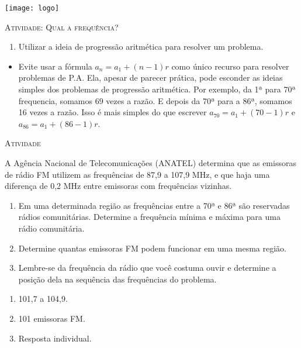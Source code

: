 \documentclass[10 pt,usenames,dvipsnames, oneside]{article}
\begin{document}
\begin{center}
  \begin{minipage}[l]{3cm}
\texttt{[image: logo]}    
\end{minipage}\hfill
\begin{minipage}[r]{.8\textwidth}
 {\Large \scshape Atividade: Qual a frequência?}  
\end{minipage}
\end{center}
\vspace{.2cm}

\ifdefined\prof
\begin{objetivos}
\item \phantom{a}
\end{objetivos}

\begin{goals}
\begin{enumerate}
\item Utilizar a ideia de progressão aritmética para resolver um problema.
\end{enumerate}

\tcblower
\begin{itemize}
\item Evite usar a fórmula $a_n=a_1+(n−1)r$ como único recurso para resolver problemas de P.A. Ela, apesar de parecer prática, pode esconder as ideias simples dos problemas de progressão aritmética. Por exemplo, da 1ª para 70ª frequencia, somamos $69$ vezes a razão. E depois da 70ª para a 86ª, somamos 16 vezes a razão. Isso é mais simples do que escrever $a_70=a_1+(70−1)r$ e $a_86=a_1+(86−1)r$.
\end{itemize}

\end{goals}

\bigskip
\begin{center}
{\large \scshape Atividade}
\end{center}
\fi

A Agência Nacional de Telecomunicações (ANATEL) determina que as emissoras de rádio FM utilizem as frequências de 87,9 a 107,9 MHz, e que haja uma diferença de 0,2 MHz entre emissoras com frequências vizinhas.
\begin{enumerate}
\item Em uma determinada região as frequências entre a 70ª e 86ª são reservadas rádios comunitárias. Determine a frequência mínima e máxima para uma rádio comunitária.
\item Determine quantas emissoras FM podem funcionar em uma mesma região.
\item Lembre-se da frequência da rádio que você costuma ouvir e determine a posição dela na sequência das frequências do problema.
\end{enumerate}
\ifdefined\prof
\begin{solucao}
\begin{enumerate}

\item 101,7 a 104,9.
\item 101 emissoras FM.
\item Resposta individual.

\end{enumerate}
\end{solucao}
\fi
\end{document}
